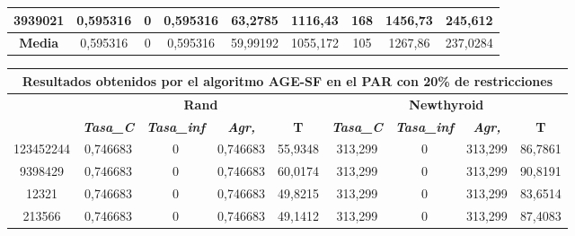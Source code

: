 \documentclass[12pt, spanish]{article}
\begin{document}
\begin{table}[H]
\begin{tabular}{|c|c|c|c|c|c|c|c|c|}
3939021           & 0,595316                  & 0                           & 0,595316               & 63,2785    & 1116,43                   & 168                         & 1456,73                & 245,612    \\ \hline
\textbf{Media}    & 0,595316                  & 0                           & 0,595316               & 59,99192   & 1055,172                  & 105                         & 1267,86                & 237,0284   \\ \hline
\end{tabular}
\end{table}


\begin{table}[H]
\footnotesize
\begin{tabular}{|c|c|c|c|c|c|c|c|c|}
\hline
\multicolumn{9}{|c|}{\textbf{Resultados obtenidos por el algoritmo AGE-SF en el PAR con 20\% de restricciones}}                                                                                                   \\ \hline
\multirow{2}{*}{} & \multicolumn{4}{c|}{\textbf{Rand}}                                                            & \multicolumn{4}{c|}{\textbf{Newthyroid}}                                                      \\ \cline{2-9} 
                  & \textit{\textbf{Tasa\_C}} & \textit{\textbf{Tasa\_inf}} & \textit{\textbf{Agr,}} & \textbf{T} & \textit{\textbf{Tasa\_C}} & \textit{\textbf{Tasa\_inf}} & \textit{\textbf{Agr,}} & \textbf{T} \\ \hline
123452244         & 0,746683                  & 0                           & 0,746683               & 55,9348    & 313,299                   & 0                           & 313,299                & 86,7861    \\ \hline
9398429           & 0,746683                  & 0                           & 0,746683               & 60,0174    & 313,299                   & 0                           & 313,299                & 90,8191    \\ \hline
12321             & 0,746683                  & 0                           & 0,746683               & 49,8215    & 313,299                   & 0                           & 313,299                & 83,6514    \\ \hline
213566            & 0,746683                  & 0                           & 0,746683               & 49,1412    & 313,299                   & 0                           & 313,299                & 87,4083    \\ \hline

\end{tabular}
\end{table}
\end{document}
